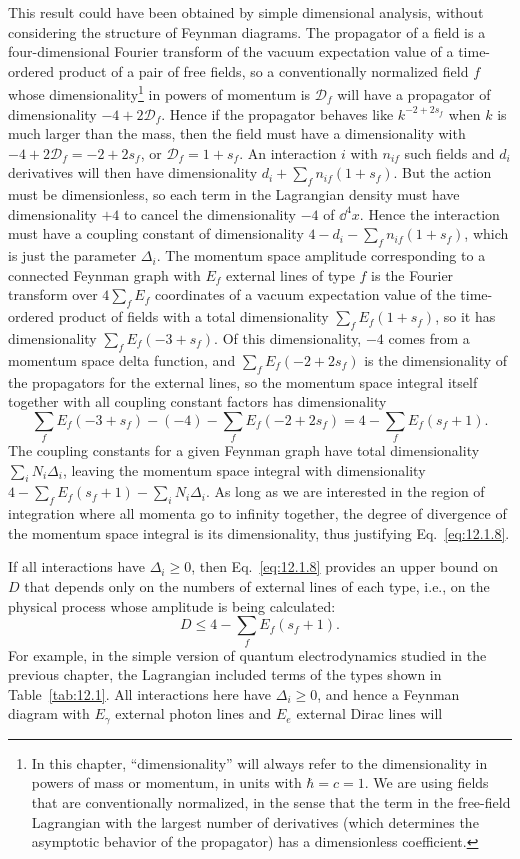 This result could have been obtained by simple dimensional analysis, without
considering the structure of Feynman diagrams. The propagator of a field is a
four-dimensional Fourier transform of the vacuum expectation value of a
time-ordered product of a pair of free fields, so a conventionally normalized
field $f$ whose dimensionality\footnote{In this chapter, ``dimensionality''
will always refer to the dimensionality in powers of mass or momentum, in
units with $\hbar=c=1$. We are using fields that are conventionally
normalized, in the sense that the term in the free-field Lagrangian with the
largest number of derivatives (which determines the asymptotic behavior of the
propagator) has a dimensionless coefficient.} in powers of momentum is
$\mathcal D_f$ will have a propagator of dimensionality $-4+2\mathcal D_f$.
Hence if the propagator behaves like $k^{-2+2s_f}$ when $k$ is much larger
than the mass, then the field must have a dimensionality with
$-4+2\mathcal D_f=-2+2s_f$, or $\mathcal D_f=1+s_f$. An interaction $i$ with
$n_{if}$ such fields and $d_i$ derivatives will then have dimensionality
$d_i+\sum_f n_{if}(1+s_f)$. But the action must be dimensionless, so each
term in the Lagrangian density must have dimensionality $+4$ to cancel the
dimensionality $-4$ of $\dd^4x$. Hence the interaction must have a coupling
constant of dimensionality $4-d_i-\sum_f n_{if}(1+s_f)$, which is just the
parameter $\Delta_i$. The momentum space amplitude corresponding to a
connected Feynman graph with $E_f$ external lines of type $f$ is the Fourier
transform over $4\sum_f E_f$ coordinates of a vacuum expectation value of the
time-ordered product of fields with a total dimensionality
$\sum_f E_f(1+s_f)$, so it has dimensionality $\sum_f E_f(-3+s_f)$. Of this
dimensionality, $-4$ comes from a momentum space delta function, and
$\sum_f E_f(-2+2s_f)$ is the dimensionality of the propagators for the
external lines, so the momentum space integral itself together with all
coupling constant factors has dimensionality
\[
  \sum_f E_f(-3+s_f)-(-4)-\sum_f E_f(-2+2s_f)
  =4-\sum_f E_f(s_f+1).
\]
The coupling constants for a given Feynman graph have total dimensionality
$\sum_i N_i\Delta_i$, leaving the momentum space integral with dimensionality
$4-\sum_f E_f(s_f+1)-\sum_iN_i\Delta_i$. As long as we are interested in the
region of integration where all momenta go to infinity together, the degree of
divergence of the momentum space integral is its dimensionality, thus
justifying Eq.~\eqref{eq:12.1.8}.

If all interactions have $\Delta_i\geq0$, then Eq.~\eqref{eq:12.1.8} provides
an upper bound on $D$ that depends only on the numbers of external lines of
each type, i.e., on the physical process whose amplitude is being calculated:
\begin{equation}
  D\leq4-\sum_f E_f(s_f+1).
  \tag{12.1.10}\label{eq:12.1.10}
\end{equation}
For example, in the simple version of quantum electrodynamics studied in the
previous chapter, the Lagrangian included terms of the types shown in
Table~\ref{tab:12.1}. All interactions here have $\Delta_i\geq0$, and hence a
Feynman diagram with $E_\gamma$ external photon lines and $E_e$ external Dirac
lines will

